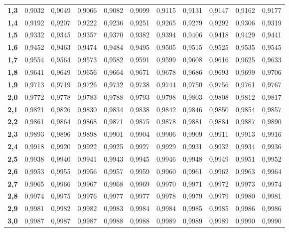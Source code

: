 \documentclass[11pt,a4paper]{article}
\begin{document}
\begin{center}
\begin{tabular}{c|cccccccccc}
\textbf{1,3} & 0,9032 & 0,9049 & 0,9066 & 0,9082 & 0,9099 & 0,9115 & 0,9131 & 0,9147 & 0,9162 & 0,9177\\
\textbf{1,4} & 0,9192 & 0,9207 & 0,9222 & 0,9236 & 0,9251 & 0,9265 & 0,9279 & 0,9292 & 0,9306 & 0,9319\\[2pt]
\textbf{1,5} & 0,9332 & 0,9345 & 0,9357 & 0,9370 & 0,9382 & 0,9394 & 0,9406 & 0,9418 & 0,9429 & 0,9441\\
\textbf{1,6} & 0,9452 & 0,9463 & 0,9474 & 0,9484 & 0,9495 & 0,9505 & 0,9515 & 0,9525 & 0,9535 & 0,9545\\
\textbf{1,7} & 0,9554 & 0,9564 & 0,9573 & 0,9582 & 0,9591 & 0,9599 & 0,9608 & 0,9616 & 0,9625 & 0,9633\\
\textbf{1,8} & 0,9641 & 0,9649 & 0,9656 & 0,9664 & 0,9671 & 0,9678 & 0,9686 & 0,9693 & 0,9699 & 0,9706\\
\textbf{1,9} & 0,9713 & 0,9719 & 0,9726 & 0,9732 & 0,9738 & 0,9744 & 0,9750 & 0,9756 & 0,9761 & 0,9767\\[2pt]
\textbf{2,0} & 0,9772 & 0,9778 & 0,9783 & 0,9788 & 0,9793 & 0,9798 & 0,9803 & 0,9808 & 0,9812 & 0,9817\\
\textbf{2,1} & 0,9821 & 0,9826 & 0,9830 & 0,9834 & 0,9838 & 0,9842 & 0,9846 & 0,9850 & 0,9854 & 0,9857\\
\textbf{2,2} & 0,9861 & 0,9864 & 0,9868 & 0,9871 & 0,9875 & 0,9878 & 0,9881 & 0,9884 & 0,9887 & 0,9890\\
\textbf{2,3} & 0,9893 & 0,9896 & 0,9898 & 0,9901 & 0,9904 & 0,9906 & 0,9909 & 0,9911 & 0,9913 & 0,9916\\
\textbf{2,4} & 0,9918 & 0,9920 & 0,9922 & 0,9925 & 0,9927 & 0,9929 & 0,9931 & 0,9932 & 0,9934 & 0,9936\\[2pt]
\textbf{2,5} & 0,9938 & 0,9940 & 0,9941 & 0,9943 & 0,9945 & 0,9946 & 0,9948 & 0,9949 & 0,9951 & 0,9952\\
\textbf{2,6} & 0,9953 & 0,9955 & 0,9956 & 0,9957 & 0,9959 & 0,9960 & 0,9961 & 0,9962 & 0,9963 & 0,9964\\
\textbf{2,7} & 0,9965 & 0,9966 & 0,9967 & 0,9968 & 0,9969 & 0,9970 & 0,9971 & 0,9972 & 0,9973 & 0,9974\\
\textbf{2,8} & 0,9974 & 0,9975 & 0,9976 & 0,9977 & 0,9977 & 0,9978 & 0,9979 & 0,9979 & 0,9980 & 0,9981\\
\textbf{2,9} & 0,9981 & 0,9982 & 0,9982 & 0,9983 & 0,9984 & 0,9984 & 0,9985 & 0,9985 & 0,9986 & 0,9986\\[2pt]
\textbf{3,0} & 0,9987 & 0,9987 & 0,9987 & 0,9988 & 0,9988 & 0,9989 & 0,9989 & 0,9989 & 0,9990 & 0,9990\\

\end{tabular}
\end{center}
\end{document}
